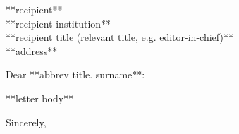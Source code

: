 \documentclass[11pt]{letter}
\begin{document}
    \begin{letter} {
      **recipient** \\
      \small
      **recipient institution** \\
			**recipient title (relevant title, e.g. editor-in-chief)** \\
			**address**}
      \opening{
      Dear **abbrev title. surname**:}
      \begin{spacing}{1.0}

			**letter body**
			
      \end{spacing}
      \closing{Sincerely,}
    \end{letter}
\end{document}
